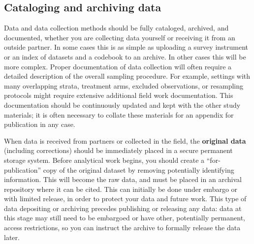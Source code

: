 \subsection{Cataloging and archiving data}

Data and data collection methods should be fully cataloged, archived, and documented,
whether you are collecting data yourself or receiving it from an outside partner.
In some cases this is as simple as uploading
a survey instrument or an index of datasets and a codebook to an archive.
In other cases this will be more complex.
Proper documentation of data collection will often require
a detailed description of the overall sampling procedure.
For example, settings with many overlapping strata,
treatment arms, excluded observations, or resampling protocols
might require extensive additional field work documentation.
This documentation should be continuously updated
and kept with the other study materials;
it is often necessary to collate these materials
for an appendix for publication in any case.

When data is received from partners or collected in the field,
the \textbf{original data} (including corrections)
should be immediately placed in a secure permanent storage system.
Before analytical work begins, you should create a ``for-publication''
copy of the original dataset by removing potentially identifying information.
This will become the raw data, and must be
placed in an archival repository where it can be cited.
This can initially be done under embargo or with limited release,
in order to protect your data and future work.
This type of data depositing or archiving
precedes publishing or releasing any data:
data at this stage may still need to be embargoed
or have other, potentially permanent, access restrictions,
so you can instruct the archive to formally release the data later.

